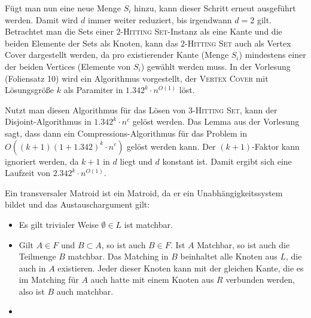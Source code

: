 Fügt man nun eine neue Menge $S_i$ hinzu, kann dieser Schritt erneut ausgeführt werden. Damit wird $d$ immer weiter reduziert, bis irgendwann $d=2$ gilt. Betrachtet man die Sets einer $2$-\textsc{Hitting Set}-Instanz als eine Kante und die beiden Elemente der Sets als Knoten, kann das $2$-\textsc{Hitting Set} auch als Vertex Cover dargestellt werden, da pro existierender Kante (Menge $S_i$) mindestens einer der beiden Vertices (Elemente von $S_i$) gewählt werden muss. In der Vorlesung (Foliensatz 10) wird ein Algorithmus vorgestellt, der \textsc{Vertex Cover} mit Lösungsgröße $k$ als Paramiter in $1.342^k \cdot n^{O(1)}$ löst. 

Nutzt man diesen Algorithmus für das Lösen von $3$-\textsc{Hitting Set}, kann der Disjoint-Algorithmus in $1.342^k \cdot n^c$ gelöst werden. Das Lemma aus der Vorlesung sagt, dass dann ein Compressions-Algorithmus für das Problem in $O((k+1)(1+1.342)^k \cdot n^c)$ gelöst werden kann. Der $(k+1)$-Faktor kann ignoriert werden, da $k+1$ in $d$ liegt und $d$ konstant ist. Damit ergibt sich eine Laufzeit von $2.342^k \cdot n^{O(1)}$.


\how



Ein transversaler Matroid ist ein Matroid, da er ein Unabhängigkeitssystem bildet und das Austauschargument gilt:

\begin{itemize}
\item Es gilt trivialer Weise $\emptyset \in L$ ist matchbar.

\item Gilt $A \in F$ und $B \subset A$, so ist auch $B \in F$. Ist $A$ Matchbar, so ist auch die Teilmenge $B$ matchbar. Das Matching in $B$ beinhaltet alle Knoten aus $L$, die auch in $A$ existieren. Jeder dieser Knoten kann mit der gleichen Kante, die es im Matching für $A$ auch hatte mit einem Knoten aus $R$ verbunden werden, also ist $B$ auch matchbar.

\item 
\end{itemize}

\subexercise
\subexercise



